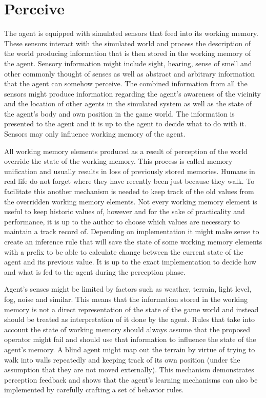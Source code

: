 \section{Perceive}

The agent is equipped with simulated sensors that feed into its working memory.
These sensors interact with the simulated world and process the description of the world producing information that is then stored in the working memory of the agent.
Sensory information might include sight, hearing, sense of smell and other commonly thought of senses as well as abstract and arbitrary information that the agent can somehow perceive.
The combined information from all the sensors might produce information regarding the agent's awareness of the vicinity and the location of other agents in the simulated system as well as the state of the agent's body and own position in the game world.
The information is presented to the agent and it is up to the agent to decide what to do with it.
Sensors may only influence working memory of the agent.

All working memory elements produced as a result of perception of the world override the state of the working memory.
This process is called memory unification and usually results in loss of previously stored memories.
Humans in real life do not forget where they have recently been just because they walk.
To facilitate this another mechanism is needed to keep track of the old values from the overridden working memory elements.
Not every working memory element is useful to keep historic values of, however and for the sake of practicality and performance, it is up to the author to choose which values are necessary to maintain a track record of.
Depending on implementation it might make sense to create an inference rule that will save the state of some working memory elements with a prefix to be able to calculate change between the current state of the agent and its previous value.
It is up to the exact implementation to decide how and what is fed to the agent during the perception phase.

Agent's senses might be limited by factors such as weather, terrain, light level, fog, noise and similar.
This means that the information stored in the working memory is not a direct representation of the state of the game world and instead should be treated as interpretation of it done by the agent.
Rules that take into account the state of working memory should always assume that the proposed operator might fail and should use that information to influence the state of the agent's memory.
A blind agent might map out the terrain by virtue of trying to walk into walls repeatedly and keeping track of its own position (under the assumption that they are not moved externally).
This mechanism demonstrates perception feedback and shows that the agent's learning mechanisms can also be implemented by carefully crafting a set of behavior rules.

